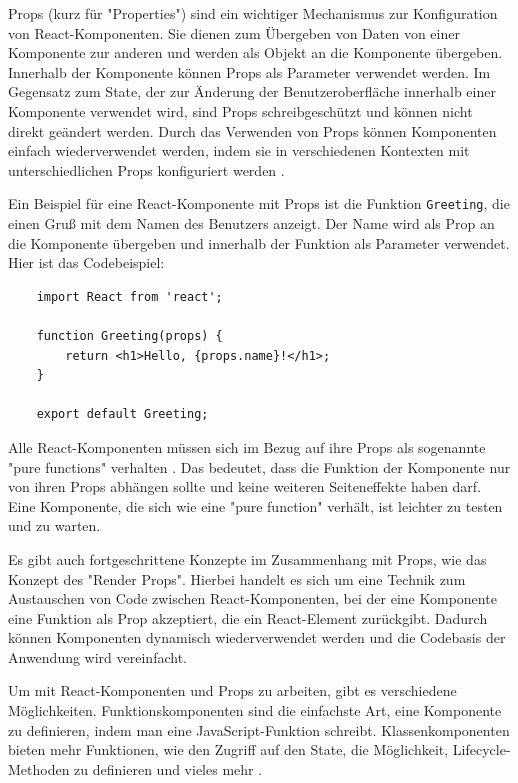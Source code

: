 Props (kurz für "Properties") sind ein wichtiger Mechanismus zur Konfiguration von React-Komponenten. Sie dienen zum Übergeben von Daten von einer Komponente zur anderen und werden als Objekt an die Komponente übergeben. Innerhalb der Komponente können Props als Parameter verwendet werden. Im Gegensatz zum State, der zur Änderung der Benutzeroberfläche innerhalb einer Komponente verwendet wird, sind Props schreibgeschützt und können nicht direkt geändert werden. Durch das Verwenden von Props können Komponenten einfach wiederverwendet werden, indem sie in verschiedenen Kontexten mit unterschiedlichen Props konfiguriert werden \cite{ReactComponentsAndProps}.

Ein Beispiel für eine React-Komponente mit Props ist die Funktion \verb|Greeting|, die einen Gruß mit dem Namen des Benutzers anzeigt. Der Name wird als Prop an die Komponente übergeben und innerhalb der Funktion als Parameter verwendet. Hier ist das Codebeispiel:

\begin{verbatim}
	import React from 'react';
	
	function Greeting(props) {
		return <h1>Hello, {props.name}!</h1>;
	}
	
	export default Greeting;
\end{verbatim}

Alle React-Komponenten müssen sich im Bezug auf ihre Props als sogenannte "pure functions" verhalten \cite{ReactComponentsAndProps}. Das bedeutet, dass die Funktion der Komponente nur von ihren Props abhängen sollte und keine weiteren Seiteneffekte haben darf. Eine Komponente, die sich wie eine "pure function" verhält, ist leichter zu testen und zu warten.

Es gibt auch fortgeschrittene Konzepte im Zusammenhang mit Props, wie das Konzept des "Render Props". Hierbei handelt es sich um eine Technik zum Austauschen von Code zwischen React-Komponenten, bei der eine Komponente eine Funktion als Prop akzeptiert, die ein React-Element zurückgibt. Dadurch können Komponenten dynamisch wiederverwendet werden und die Codebasis der Anwendung wird vereinfacht\cite{ReactRenderProps}.

Um mit React-Komponenten und Props zu arbeiten, gibt es verschiedene Möglichkeiten. Funktionskomponenten sind die einfachste Art, eine Komponente zu definieren, indem man eine JavaScript-Funktion schreibt. Klassenkomponenten bieten mehr Funktionen, wie den Zugriff auf den State, die Möglichkeit, Lifecycle-Methoden zu definieren und vieles mehr \cite{RunebookReactComponentsAndProps}.

